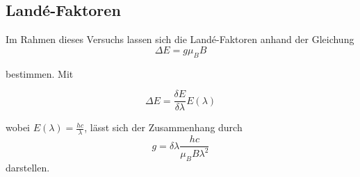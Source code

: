 \subsection{Landé-Faktoren}

Im Rahmen dieses Versuchs lassen sich die Landé-Faktoren anhand der Gleichung 
\begin{equation}
    \Delta E = g\mu_B B 
\end{equation} 

bestimmen. Mit

\begin{equation}
    \Delta E = \frac{\delta E}{\delta\lambda}E(\lambda)
\end{equation}

wobei $E(\lambda) = \frac{hc}{\lambda}$, lässt sich der Zusammenhang durch 
\begin{equation*}
    g = \delta\lambda\frac{hc}{\mu_B B \lambda^2}
    \label{eqn:lande}
\end{equation*} darstellen. 